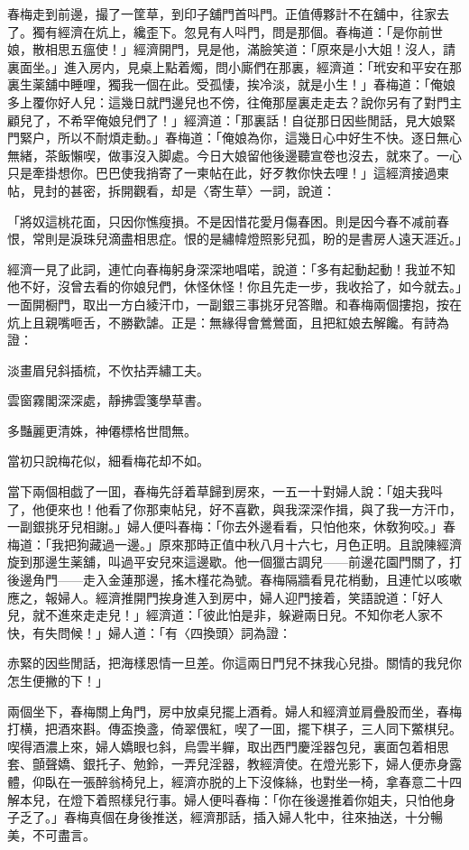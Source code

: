 春梅走到前邊，撮了一筐草，到印子舖門首呌門。正值傅夥計不在舖中，往家去了。獨有經濟在炕上，纔歪下。忽見有人呌門，問是那個。春梅道：「是你前世娘，散相思五瘟使！」經濟開門，見是他，滿臉笑道：「原來是小大姐！沒人，請裏面坐。」進入房内，見桌上點着燭，問小廝們在那裏，經濟道：「玳安和平安在那裏生薬舖中睡哩，獨我一個在此。受孤悽，挨冷淡，就是小生！」春梅道：「俺娘多上覆你好人兒：這幾日就門邊兒也不傍，往俺那屋裏走走去？說你另有了對門主顧兒了，不希罕俺娘兒們了！」經濟道：「那裏話！自従那日因些閒話，見大娘緊門緊户，所以不耐煩走動。」春梅道：「俺娘為你，這幾日心中好生不快。逐日無心無緒，茶飯懶喫，做事沒入脚處。今日大娘留他後邊聽宣卷也沒去，就來了。一心只是牽掛想你。巴巴使我捎寄了一柬帖在此，好歹教你快去哩！」這經濟接過柬帖，見封的甚密，拆開觀看，却是〈寄生草〉一詞，說道：

「將奴這桃花面，只因你憔瘦損。不是因惜花愛月傷春困。則是因今春不减前春恨，常則是淚珠兒滴盡相思症。恨的是繡幃燈照影兒孤，盼的是書房人遠天涯近。」

經濟一見了此詞，連忙向春梅躬身深深地唱喏，說道：「多有起動起動！我並不知他不好，沒曾去看的你娘兒們，休怪休怪！你且先走一步，我收拾了，如今就去。」一面開橱門，取出一方白綾汗巾，一副銀三事挑牙兒答贈。和春梅兩個摟抱，按在炕上且親嘴咂舌，不勝歡謔。正是：無緣得會鶯鶯面，且把紅娘去解饞。有詩為證：

淡畫眉兒斜插梳，不忺拈弄繡工夫。

雲窗霧閣深深處，靜拂雲箋學草書。

多豔麗更清姝，神僊標格世間無。

當初只說梅花似，細看梅花却不如。

當下兩個相戯了一囬，春梅先㧱着草歸到房來，一五一十對婦人說：「姐夫我呌了，他便來也！他看了你那柬帖兒，好不喜歡，與我深深作揖，與了我一方汗巾，一副銀挑牙兒相謝。」婦人便呌春梅：「你去外邊看看，只怕他來，休敎狗咬。」春梅道：「我把狗藏過一邊。」原來那時正值中秋八月十六七，月色正明。且說陳經濟旋到那邊生薬舖，叫過平安兒來這邊歇。他一個獵古調兒——前邊花園門關了，打後邊角門——走入金蓮那邊，搖木槿花為號。春梅隔牆看見花梢動，且連忙以咳嗽應之，報婦人。經濟推開門挨身進入到房中，婦人迎門接着，笑語說道：「好人兒，就不進來走走兒！」經濟道：「彼此怕是非，躲避兩日兒。不知你老人家不快，有失問候！」婦人道：「有〈四換頭〉詞為證：

赤緊的因些閒話，把海樣恩情一旦差。你這兩日門兒不抹我心兒掛。關情的我兒你怎生便撇的下！」

兩個坐下，春梅關上角門，房中放桌兒擺上酒肴。婦人和經濟並肩疊股而坐，春梅打横，把酒來斟。傳盃換盞，倚翠偎紅，喫了一囬，擺下棋子，三人同下鱉棋兒。喫得酒濃上來，婦人嬌眼乜斜，烏雲半軃，取出西門慶淫器包兒，裏面包着相思套、顫聲嬌、銀托子、勉鈴，一弄兒淫器，教經濟使。在燈光影下，婦人便赤身露體，仰臥在一張醉翁椅兒上，經濟亦脱的上下沒條絲，也對坐一椅，拿春意二十四解本兒，在燈下着照樣兒行事。婦人便呌春梅：「你在後邊推着你姐夫，只怕他身子乏了。」春梅真個在身後推送，經濟那話，插入婦人牝中，往來抽送，十分暢美，不可盡言。

